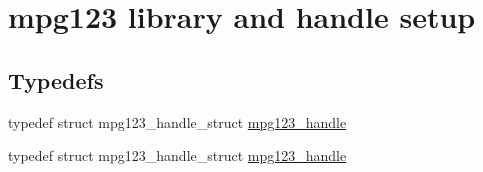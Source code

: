 \hypertarget{group__mpg123__init}{}\section{mpg123 library and handle setup}
\label{group__mpg123__init}
\subsection*{Typedefs}
\begin{DoxyCompactItemize}
\item 
typedef struct mpg123\+\_\+handle\+\_\+struct \hyperlink{group__mpg123__init_ga6728e2839a395f3a07d4514da659faca}{mpg123\+\_\+handle}
\item 
typedef struct mpg123\+\_\+handle\+\_\+struct \hyperlink{group__mpg123__init_ga6728e2839a395f3a07d4514da659faca}{mpg123\+\_\+handle}
\end{DoxyCompactItemize}
